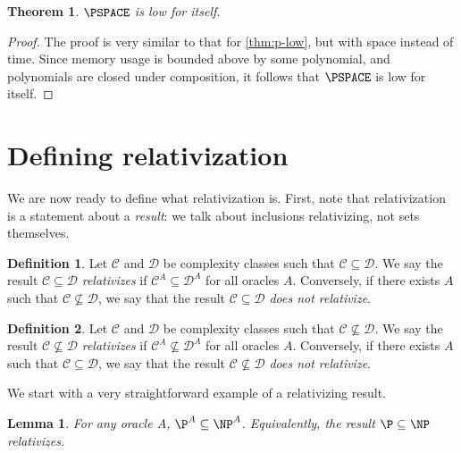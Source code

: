 \documentclass[english,12pt]{reedthesis}
\theoremstyle{plain}
\newtheorem{thm}{Theorem}[section]
\newtheorem{lemma}[lemma]{Lemma}
\theoremstyle{definition}
\newtheorem{defn}[defn]{Definition}
\theoremstyle{remark}
\begin{document}
\begin{thm}\label{thm:pspace-low}
  $\PSPACE$ is low for itself.
\end{thm}

\begin{proof}
  The proof is very similar to that for \cref{thm:p-low}, but with space instead
  of time. Since memory usage is bounded above by some polynomial, and
  polynomials are closed under composition, it follows that $\PSPACE$ is low for
  itself.
\end{proof}

\section{Defining relativization}

We are now ready to define what relativization is. First, note that
relativization is a statement about a \emph{result}: we talk about inclusions
relativizing, not sets themselves.

\begin{defn}\label{def:relativization}
  Let $\mathcal{C}$ and $\mathcal{D}$ be complexity classes such that $\mathcal{C} \subseteq \mathcal{D}$. We say the result
  $\mathcal{C} \subseteq \mathcal{D}$ \emph{relativizes} if $\mathcal{C}^{A} \subseteq \mathcal{D}^{A}$ for all oracles $A$. Conversely,
  if there exists $A$ such that $\mathcal{C} \nsubseteq \mathcal{D}$, we say that the result $\mathcal{C} \subseteq \mathcal{D}$
  \emph{does not relativize}.
\end{defn}

\begin{defn}\label{def:relativization-ne}
  Let $\mathcal{C}$ and $\mathcal{D}$ be complexity classes such that $\mathcal{C} \nsubseteq \mathcal{D}$. We say the result
  $\mathcal{C} \nsubseteq \mathcal{D}$ \emph{relativizes} if $\mathcal{C}^{A} \nsubseteq \mathcal{D}^{A}$ for all oracles $A$. Conversely,
  if there exists $A$ such that $\mathcal{C} \subseteq \mathcal{D}$, we say that the result $\mathcal{C} \nsubseteq \mathcal{D}$
  \emph{does not relativize}.
\end{defn}

We start with a very straightforward example of a relativizing result.

\begin{lemma}\label{lem:pa-subset-npa}
  For any oracle $A$, $\P^{A} \subseteq \NP^{A}$. Equivalently, the result $\P \subseteq \NP$
  relativizes.
\end{lemma}
\end{document}
